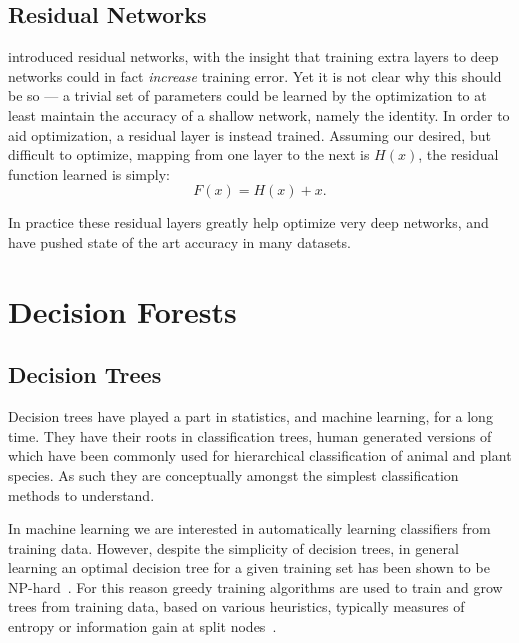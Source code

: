 \documentclass[thesis]{subfiles}
\begin{document}

\subsection{Residual Networks}\label{residualnetworks}
\citet{He2015} introduced residual networks, with the insight that training extra layers to deep networks could in fact \emph{increase} training error. Yet it is not clear why this should be so --- a trivial set of parameters could be learned by the optimization to at least maintain the accuracy of a shallow network, namely the identity. In order to aid optimization, a residual layer is instead trained. Assuming our desired, but difficult to optimize, mapping from one layer to the next is $H(x)$, the residual function learned is simply:
\begin{equation}
	F(x) = H(x) + x.
\end{equation}

In practice these residual layers greatly help optimize very deep networks, and have pushed state of the art accuracy in many datasets.

\section{Decision Forests}
\subsection{Decision Trees}
Decision trees have played a part in statistics, and machine learning, for a long time. They have their roots in classification trees, human generated versions of which have been commonly used for hierarchical classification of animal and plant species. As such they are conceptually amongst the simplest classification methods to understand. 

In machine learning we are interested in automatically learning classifiers from training data. However, despite the simplicity of decision trees, in general learning an optimal decision tree for a given training set has been shown to be NP-hard~\citep{journals/iandc/HancockJLT96}. For this reason greedy training algorithms are used to train and grow trees from training data, based on various heuristics, typically measures of entropy or information gain at split nodes~\citep{breiman84}. 
\end{document}

